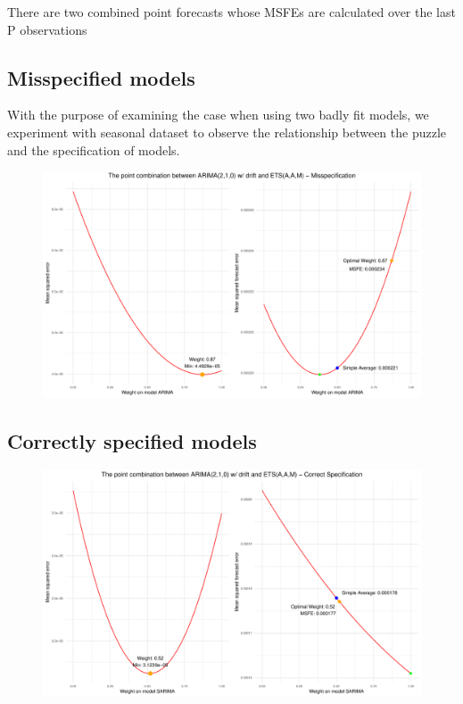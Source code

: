 \documentclass{monashthesis}
\begin{document}
There are two combined point forecasts whose MSFEs are calculated over the last P observations

\hypertarget{misspecified-models}{%
\subsection{Misspecified models}\label{misspecified-models}}

With the purpose of examining the case when using two badly fit models, we experiment with seasonal dataset to observe the relationship between the puzzle and the specification of models.

\begin{figure}[ht]
\centering
\includegraphics[scale=0.5]{figures/EMPL_misspecified.pdf}
\caption{}
\label{fig:sdm}
\end{figure}

\hypertarget{correctly-specified-models}{%
\subsection{Correctly specified models}\label{correctly-specified-models}}

\begin{figure}[ht]
\centering
\includegraphics[scale=0.5]{figures/EMPL_correct.pdf}
\caption{}
\label{fig:sdc}
\end{figure}
\end{document}
